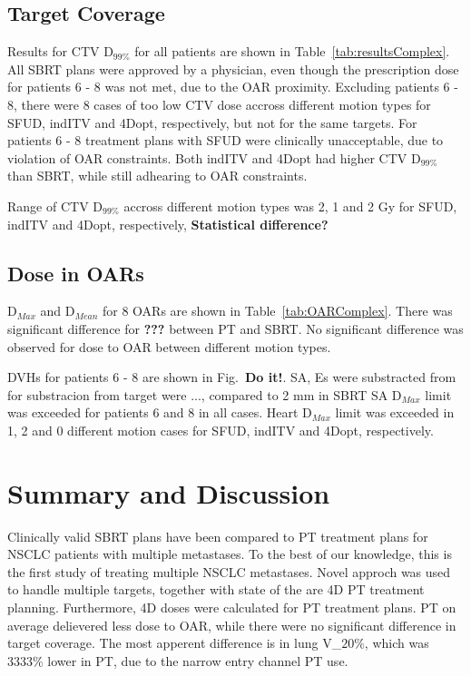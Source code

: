 \documentclass[type=dr, dr=rernat, accentcolor=tud7b,colorbacktitle, bigchapter, openright, twoside, 12pt ]{tudthesis}
\begin{document}
\subsection{Target Coverage}

Results for CTV D$_{99\%}$ for all patients are shown in Table~\ref{tab:resultsComplex}. All SBRT plans were approved by a physician, 
even though the prescription dose for patients 6 - 8 was not met, due to the OAR proximity. Excluding patients 6 - 8, there were 8  cases of too low CTV dose accross different
motion types for SFUD, indITV and 4Dopt, respectively, but not for the same targets.
For patients 6 - 8 treatment plans with SFUD were clinically unacceptable, due to violation of OAR constraints. Both indITV and 4Dopt had higher CTV D$_{99\%}$ than SBRT, while still adhearing
to OAR constraints. 

Range of CTV D$_{99\%}$ accross different motion types was 2, 1 and 2 Gy for SFUD, indITV and 4Dopt, respectively, \textbf{Statistical difference?}



\subsection{Dose in OARs}

D$_{Max}$ and D$_{Mean}$ for 8 OARs are shown in Table~\ref{tab:OARComplex}. There was significant difference for \textbf{???} between PT and SBRT. No significant difference was observed for dose to OAR between different motion types.

DVHs for patients 6 - 8 are shown in Fig.~\textbf{Do it!}. SA, Es were substracted from for substracion from target were ..., compared to 2 mm in SBRT
SA D$_{Max}$ limit was exceeded for patients 6 and 8 in all cases. Heart D$_{Max}$ limit was exceeded in 1, 2 and 0 different motion cases for SFUD, indITV and 4Dopt, respectively.





\section{Summary and Discussion}

Clinically valid SBRT plans have been compared to PT treatment plans for NSCLC patients with multiple metastases. To the best of our knowledge, this is the first study of treating multiple NSCLC metastases. Novel approch was used to handle multiple targets, together
with state of the are 4D PT treatment planning. Furthermore, 4D doses were calculated for PT treatment plans. PT on average delievered less dose to OAR, while there were no
significant difference in target coverage. The most apperent difference is in lung V_${20\%}$, which was 3333\% lower in PT, due to the narrow entry channel PT use.
\end{document}
